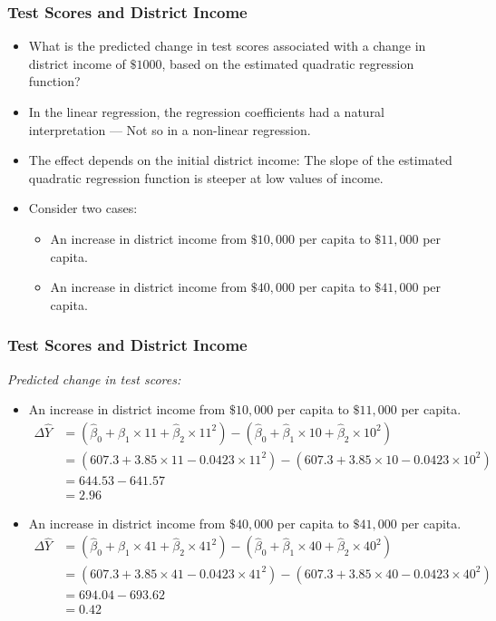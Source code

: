\begin{frame}
\frametitle{Test Scores and District Income}
\begin{itemize}
\item What is the predicted change in test scores associated with a change in district income of $\$1000$, based on the estimated quadratic regression function? 
\item In the linear regression, the regression coefficients had a natural interpretation --- Not so in a non-linear regression. 
\item The effect depends on the initial district income: The slope of the estimated quadratic regression function is steeper at low values of income. 
\item Consider two cases: 
\begin{itemize}
\item An increase in district income from $\$10,000$ per capita to $\$11,000$ per capita.
\item An increase in district income from $\$40,000$ per capita to $\$41,000$ per capita.
\end{itemize}
\end{itemize}
\end{frame}


\begin{frame}
\frametitle{Test Scores and District Income}
\emph{Predicted change in test scores:}
\begin{itemize}
\item An increase in district income from $\$10,000$ per capita to $\$11,000$ per capita.
\begin{align*}
\Delta\hat{Y} 
  & = (\hat{\beta}_{0} + \hat{\beta}_{1} \times 11 + \hat{\beta}_{2} \times 11^{2})
    - (\hat{\beta}_{0} + \hat{\beta}_{1} \times 10 + \hat{\beta}_{2} \times 10^{2})\\
  & = (607.3 + 3.85 \times 11 - 0.0423 \times 11^{2})
    - (607.3 + 3.85 \times 10 - 0.0423 \times 10^{2})\\
  & = 644.53 - 641.57\\
  & = 2.96
\end{align*}
\item An increase in district income from $\$40,000$ per capita to $\$41,000$ per capita.
\begin{align*}
\Delta\hat{Y} 
  & = (\hat{\beta}_{0} + \hat{\beta}_{1} \times 41 + \hat{\beta}_{2} \times 41^{2})
    - (\hat{\beta}_{0} + \hat{\beta}_{1} \times 40 + \hat{\beta}_{2} \times 40^{2})\\
  & = (607.3 + 3.85 \times 41 - 0.0423 \times 41^{2})
    - (607.3 + 3.85 \times 40 - 0.0423 \times 40^{2})\\
  & = 694.04 - 693.62\\
  & = 0.42
\end{align*}
\end{itemize}
\end{frame}


